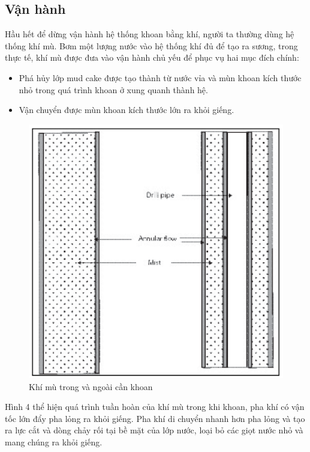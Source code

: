 \documentclass[13pt,a4paper]{article}
\begin{document}
\subsection{Vận hành}
	Hầu hết để dừng vận hành hệ thống khoan bằng khí, người ta thường dùng hệ thống khí mù. Bơm một lượng nước vào hệ thống khí đủ để tạo ra sương, trong thực tế, khí mù được đưa vào vận hành chủ yếu để phục vụ hai mục đích chính:
	\begin{itemize}
		\item Phá hủy lớp mud cake được tạo thành từ nước vỉa và mùn khoan kích thước nhỏ trong quá trình khoan ở xung quanh thành hệ.
		\item Vận chuyển được mùn khoan kích thước lớn ra khỏi giếng.
	\end{itemize}
	\par
	\begin{figure}[h]
	\centering
	\includegraphics[scale=.3]{Figs/Fig6.png}
	\caption{Khí mù trong và ngoài cần khoan}
	\end{figure}
	\par
	Hình 4 thể hiện quá trình tuần hoàn của khí mù trong khi khoan, pha khí có vận tốc lớn đẩy pha lỏng ra khỏi giếng. Pha khí di chuyển nhanh hơn pha lỏng và tạo ra lực cắt và dòng chảy rối tại bề mặt của lớp nước, loại bỏ các giọt nước nhỏ và mang chúng ra khỏi giếng.\par
\end{document}
